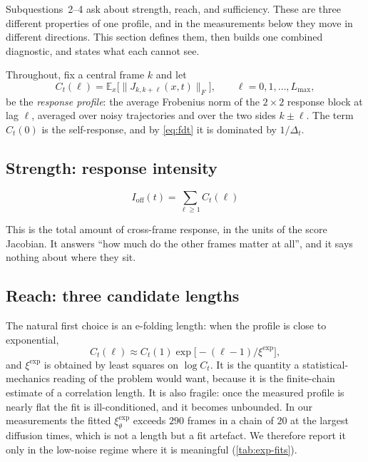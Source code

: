 \documentclass[11pt,a4paper]{article}
\newcommand{\E}{\mathbb{E}}
\newcommand{\Dt}{\Delta_t}
\begin{document}
Subquestions~2--4 ask about strength, reach, and sufficiency. These are three different
properties of one profile, and in the measurements below they move in different directions.
This section defines them, then builds one combined diagnostic, and states what each cannot
see.

Throughout, fix a central frame $k$ and let
\begin{equation}
 C_t(\ell)=\E_x\big[\|J_{k,k+\ell}(x,t)\|_F\big],
 \qquad \ell=0,1,\ldots,L_{\max},
 \label{eq:response-profile}
\end{equation}
be the \emph{response profile}: the average Frobenius norm of the $2\times2$ response block at
lag $\ell$, averaged over noisy trajectories and over the two sides $k\pm\ell$. The term
$C_t(0)$ is the self-response, and by \eqref{eq:fdt} it is dominated by $1/\Dt$.

\subsection{Strength: response intensity}

\begin{definitionbox}[Intensity]
\begin{equation}
 I_{\mathrm{off}}(t)=\sum_{\ell\ge1}C_t(\ell)
 \label{eq:intensity}
\end{equation}
\end{definitionbox}

This is the total amount of cross-frame response, in the units of the score Jacobian. It
answers ``how much do the other frames matter at all'', and it says nothing about where they
sit.

\subsection{Reach: three candidate lengths}

The natural first choice is an e-folding length: when the profile is close to exponential,
\[
 C_t(\ell)\approx C_t(1)\exp\!\big[-(\ell-1)/\xi^{\mathrm{exp}}\big],
\]
and $\xi^{\mathrm{exp}}$ is obtained by least squares on $\log C_t$. It is the quantity a
statistical-mechanics reading of the problem would want, because it is the finite-chain
estimate of a correlation length. It is also fragile: once the measured profile is nearly flat
the fit is ill-conditioned, and it becomes unbounded. In our measurements the fitted
$\xi^{\mathrm{exp}}_\theta$ exceeds $290$ frames in a chain of $20$ at the largest diffusion
times, which is not a length but a fit artefact. We therefore report it only in the low-noise
regime where it is meaningful (\cref{tab:exp-fits}).
\end{document}
